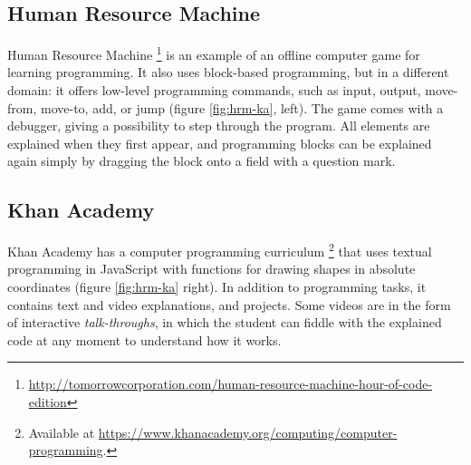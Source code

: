 \subsection{Human Resource Machine}
\label{sec:human-resource-machine}
Human Resource Machine%
\footnote{\url{http://tomorrowcorporation.com/human-resource-machine-hour-of-code-edition}}
is an example of an offline computer game for learning programming.
It also uses block-based programming, but in a different domain:
it offers low-level programming commands, such as
input, output, move-from, move-to, add, or jump
(figure \ref{fig:hrm-ka}, left).
The game comes with a debugger, giving a possibility to step through the program.
All elements are explained when they first appear, and programming blocks can
be explained again simply by dragging the block onto a field with a question
mark.


\subsection{Khan Academy}
\label{sec:khan-academy}
Khan Academy has a computer programming curriculum%
\footnote{Available at \url{https://www.khanacademy.org/computing/computer-programming}.}
that uses textual programming in JavaScript with functions for drawing shapes
in absolute coordinates %
(figure \ref{fig:hrm-ka} right).
In addition to programming tasks, it contains text and video explanations, and
projects. Some videos are in the form of interactive \emph{talk-throughs},
in which the student can fiddle with the explained code at any moment to understand
how it works.



